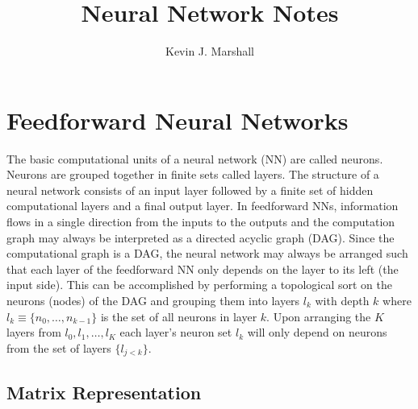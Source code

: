\documentclass[12pt,notitlepage]{article}
\begin{document}
\title{Neural Network Notes}
\author{Kevin J. Marshall}
\maketitle

\section{Feedforward Neural Networks}
\label{sec:ff-=nn}
The basic computational units of a neural network (NN) are called
neurons.  Neurons are grouped together in finite sets called layers.
The structure of a neural network consists of an input layer followed
by a finite set of hidden computational layers and a final output
layer.  In feedforward NNs, information flows in a single direction from the
inputs to the outputs and the computation graph may always be
interpreted as a directed acyclic
graph (DAG).  Since the computational graph is a DAG, the neural
network may always be arranged such that each layer of the feedforward
NN only depends on  the layer to its left (the input side).  This can
be accomplished by performing a topological sort on the neurons
(nodes) of the DAG and
grouping them into layers $l_{k}$ with depth $k$ where $l_{k} \equiv \{n_{0},\dots,n_{k-1}\}$ is the
set of all neurons in layer $k$.  Upon arranging the $K$ layers from
$l_{0},l_{1},\dots,l_{K}$ each layer's neuron set $l_{k}$ will only depend
on neurons from the set of layers $\{l_{j<k}\}$.

\subsection{Matrix Representation}
\label{sec:matrix-rep}
\end{document}
